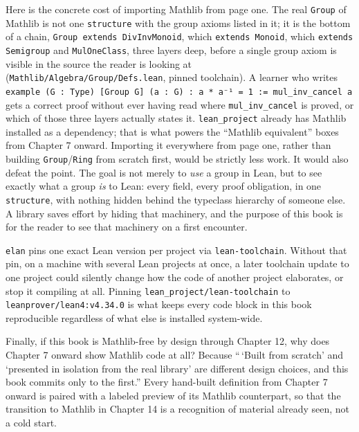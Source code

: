 Here is the concrete cost of importing Mathlib from page one. The real \texttt{Group} of Mathlib is not one \texttt{structure} with the group axioms listed in it; it is the bottom of a chain, \texttt{Group extends DivInvMonoid}, which \texttt{extends Monoid}, which \texttt{extends Semigroup} and \texttt{MulOneClass}, three layers deep, before a single group axiom is visible in the source the reader is looking at (\texttt{Mathlib/\allowbreak{}Algebra/\allowbreak{}Group/\allowbreak{}Defs.lean}, pinned toolchain). A learner who writes \texttt{example (G : Type) [Group G] (a : G) : a * a⁻¹ = 1 := mul\_\allowbreak{}inv\_\allowbreak{}cancel a} gets a correct proof without ever having read where \texttt{mul\_\allowbreak{}inv\_\allowbreak{}cancel} is proved, or which of those three layers actually states it. \texttt{lean\_\allowbreak{}project} already has Mathlib installed as a dependency; that is what powers the ``Mathlib equivalent'' boxes from Chapter 7 onward. Importing it everywhere from page one, rather than building \texttt{Group}/\texttt{Ring} from scratch first, would be strictly less work. It would also defeat the point. The goal is not merely to \emph{use} a group in Lean, but to see exactly what a group \emph{is} to Lean: every field, every proof obligation, in one \texttt{structure}, with nothing hidden behind the typeclass hierarchy of someone else. A library saves effort by hiding that machinery, and the purpose of this book is for the reader to see that machinery on a first encounter.

\texttt{elan} pins one exact Lean version per project via \texttt{lean-\allowbreak{}toolchain}. Without that pin, on a machine with several Lean projects at once, a later toolchain update to one project could silently change how the code of another project elaborates, or stop it compiling at all. Pinning \texttt{lean\_\allowbreak{}project/\allowbreak{}lean-\allowbreak{}toolchain} to \texttt{leanprover/\allowbreak{}lean4:v4.34.0} is what keeps every code block in this book reproducible regardless of what else is installed system-wide.

Finally, if this book is Mathlib-free by design through Chapter 12, why does Chapter 7 onward show Mathlib code at all? Because ``\,`Built from scratch' and `presented in isolation from the real library' are different design choices, and this book commits only to the first.'' Every hand-built definition from Chapter 7 onward is paired with a labeled preview of its Mathlib counterpart, so that the transition to Mathlib in Chapter 14 is a recognition of material already seen, not a cold start.

